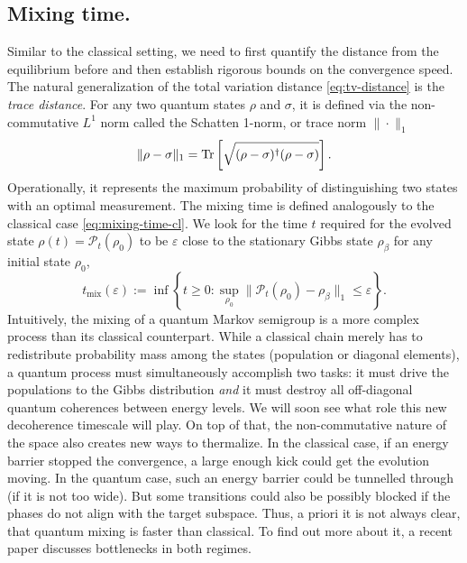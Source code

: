 \subsection{Mixing time.} Similar to the classical setting, we need to first quantify the distance from the equilibrium before and then establish rigorous bounds on the convergence speed. The natural generalization of the total variation distance \eqref{eq:tv-distance} is the \textit{trace distance}. For any two quantum states $\rho$ and $\sigma$, it is defined via the non-commutative $L^1$ norm called the Schatten 1-norm, or trace norm $\|\cdot\|_1$
\begin{equation}
    \|\rho - \sigma\|_1 = \operatorname{Tr}\left[ \sqrt{(\rho-\sigma)^\dagger (\rho-\sigma)} \right].
\end{equation}
Operationally, it represents the maximum probability of distinguishing two states with an optimal measurement. The mixing time is defined analogously to the classical case \eqref{eq:mixing-time-cl}. We look for the time $t$ required for the evolved state $\rho(t) = \mathcal{P}_t(\rho_0)$ to be $\varepsilon$ close to the stationary Gibbs state $\rho_\beta$ for any initial state $\rho_0$,
\begin{equation} \label{eq:mixing-time-defi}
    t_\text{mix}(\varepsilon) := \inf \left\{ t \ge 0 : \sup_{\rho_0} \|\mathcal{P}_t(\rho_0) - \rho_\beta\|_1 \le \varepsilon \right\}.
\end{equation}
Intuitively, the mixing of a quantum Markov semigroup is a more complex process than its classical counterpart. While a classical chain merely has to redistribute probability mass among the states (population or diagonal elements), a quantum process must simultaneously accomplish two tasks: it must drive the populations to the Gibbs distribution \textit{and} it must destroy all off-diagonal quantum coherences between energy levels. We will soon see what role this new decoherence timescale will play.
On top of that, the non-commutative nature of the space also creates new ways to thermalize. In the classical case, if an energy barrier stopped the convergence, a large enough kick could get the evolution moving. In the quantum case, such an energy barrier could be tunnelled through (if it is not too wide). But some transitions could also be possibly blocked if the phases do not align with the target subspace. Thus, a priori it is not always clear, that quantum mixing is faster than classical. To find out more about it, a recent paper \cite{rakovszky2024bottlenecks} discusses bottlenecks in both regimes. 

